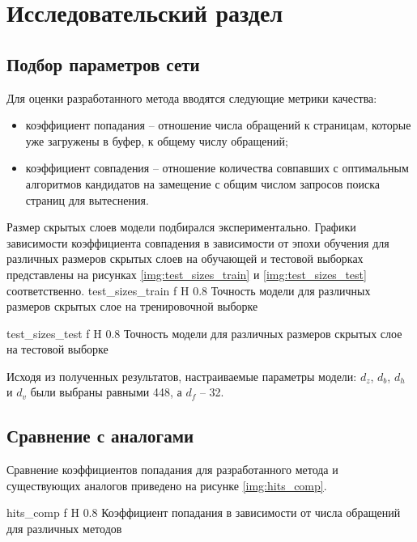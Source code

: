 \chapter{Исследовательский раздел}

\section{Подбор параметров сети}
Для оценки разработанного метода вводятся следующие метрики качества:
\begin{itemize}
	\item коэффициент попадания -- отношение числа обращений к страницам, которые уже загружены в буфер, к общему числу обращений;
	\item коэффициент совпадения -- отношение количества совпавших с оптимальным алгоритмов кандидатов на замещение с общим числом запросов поиска страниц для вытеснения.
\end{itemize}

Размер скрытых слоев модели подбирался экспериментально.
Графики зависимости коэффициента совпадения в зависимости от эпохи обучения для различных размеров скрытых слоев на обучающей и тестовой выборках представлены на рисунках \ref{img:test_sizes_train} и \ref{img:test_sizes_test} соответственно.
{test_sizes_train} %
{f} %
{H} %
{0.8\textwidth} %
{Точность модели для различных размеров скрытых слое на тренировочной выборке} %

{test_sizes_test} %
{f} %
{H} %
{0.8\textwidth} %
{Точность модели для различных размеров скрытых слое на тестовой выборке} %

Исходя из полученных результатов, настраиваемые параметры модели: $d_z$, $d_b$, $d_h$ и $d_v$ были выбраны равными 448, а $d_f$ -- 32.

\section{Сравнение с аналогами}
Сравнение коэффициентов попадания для разработанного метода и существующих аналогов приведено на рисунке \ref{img:hits_comp}.

{hits_comp} %
{f} %
{H} %
{0.8\textwidth} %
{Коэффициент попадания в зависимости от числа обращений для различных методов} %

